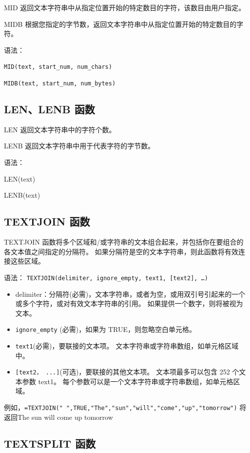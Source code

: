MID 返回文本字符串中从指定位置开始的特定数目的字符，该数目由用户指定。

MIDB 根据您指定的字节数，返回文本字符串中从指定位置开始的特定数目的字符。

语法：

\verb|MID(text, start_num, num_chars)|

\verb|MIDB(text, start_num, num_bytes)|

\subsection{LEN、LENB 函数}

LEN 返回文本字符串中的字符个数。

LENB 返回文本字符串中用于代表字符的字节数。

语法：

LEN(text)

LENB(text)

\subsection{TEXTJOIN 函数}

TEXTJOIN 函数将多个区域和/或字符串的文本组合起来，并包括你在要组合的各文本值之间指定的分隔符。 如果分隔符是空的文本字符串，则此函数将有效连接这些区域。

语法：
\verb|TEXTJOIN(delimiter, ignore_empty, text1, [text2], …)|

\begin{itemize}
  \item delimiter：分隔符(必需)，文本字符串，或者为空，或用双引号引起来的一个或多个字符，或对有效文本字符串的引用。 如果提供一个数字，则将被视为文本。
  \item \verb|ignore_empty| (必需)，如果为 TRUE，则忽略空白单元格。
  \item \verb|text1|(必需)，要联接的文本项。 文本字符串或字符串数组，如单元格区域中。
  \item \verb|[text2， ...]|(可选)，要联接的其他文本项。 文本项最多可以包含 252 个文本参数 text1。 每个参数可以是一个文本字符串或字符串数组，如单元格区域。
\end{itemize}

例如，\verb|=TEXTJOIN(" ",TRUE,"The","sun","will","come","up","tomorrow")| 将返回The sun will come up tomorrow

\subsection{TEXTSPLIT 函数}


